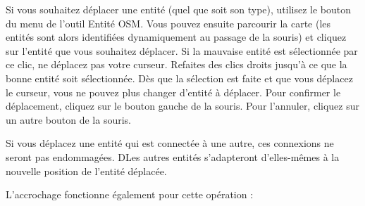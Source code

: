 Si vous souhaitez déplacer une entité (quel que soit son type), utilisez le bouton  du menu de l'outil Entité OSM. Vous pouvez ensuite parcourir la carte (les entités sont alors identifiées dynamiquement au passage de la souris) et cliquez sur l'entité que vous souhaitez déplacer. Si la mauvaise entité est sélectionnée par ce clic, ne déplacez pas votre curseur. Refaites des clics droits jusqu'à ce que la bonne entité soit sélectionnée. Dès que la sélection est faite et que vous déplacez le curseur, vous ne pouvez plus changer d'entité à déplacer. Pour confirmer le déplacement, cliquez sur le bouton gauche de la souris. Pour l'annuler, cliquez sur un autre bouton de la souris.

Si vous déplacez une entité qui est connectée à une autre, ces connexions ne seront pas endommagées. DLes autres entités s'adapteront d'elles-mêmes à la nouvelle position de l'entité déplacée.

L'accrochage fonctionne également pour cette opération :

